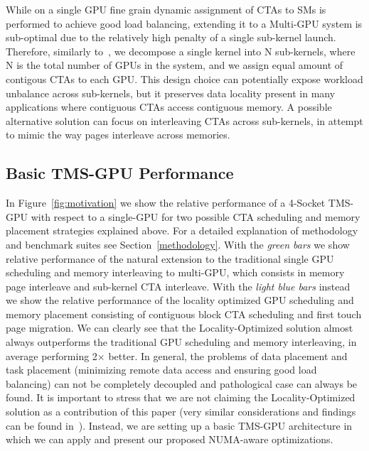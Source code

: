 While on a single GPU fine grain dynamic assignment of CTAs to SMs is performed
to achieve good load balancing, extending it to a Multi-GPU system is
sub-optimal due to the relatively high penalty of a single sub-kernel launch.
Therefore, similarly to~\cite{Cabezas2015}, we decompose a single kernel into N
sub-kernels, where N is the total number of GPUs in the system, and we assign
equal amount of contigous CTAs to each GPU.  This design choice can potentially
expose workload unbalance across sub-kernels, but it preserves data locality
present in many applications where contiguous CTAs access contiguous memory. A
possible alternative solution can focus on interleaving CTAs across
sub-kernels, in attempt to mimic the way pages interleave across memories. 

\subsection{Basic TMS-GPU Performance}
In Figure~\ref{fig:motivation} we show the relative performance of a 4-Socket
TMS-GPU with respect to a single-GPU for two possible CTA scheduling and memory
placement strategies explained above. For a detailed explanation of methodology
and benchmark suites see Section~\ref{methodology}. With the \emph{green bars}
we show relative performance of the natural extension to the traditional single
GPU scheduling and memory interleaving to multi-GPU, which consists in memory
page interleave and sub-kernel CTA interleave. With the \emph{light blue bars}
instead we show the relative performance of the locality optimized GPU
scheduling and memory placement consisting of contiguous block CTA scheduling
and first touch page migration. We can clearly see that the Locality-Optimized
solution almost always outperforms the traditional GPU scheduling and memory
interleaving, in average performing 2$\times$ better. In general, the problems of data
placement and task placement (minimizing remote data access and ensuring good
load balancing) can not be completely decoupled and pathological case can
always be found. It is important to stress that we are not claiming the
Locality-Optimized solution as a contribution of this paper (very
similar considerations and findings can be found
in~\cite{Cabezas2015, Arunkumar2017}). Instead, we are setting up a basic TMS-GPU
architecture in which we can apply and present our proposed NUMA-aware optimizations.

